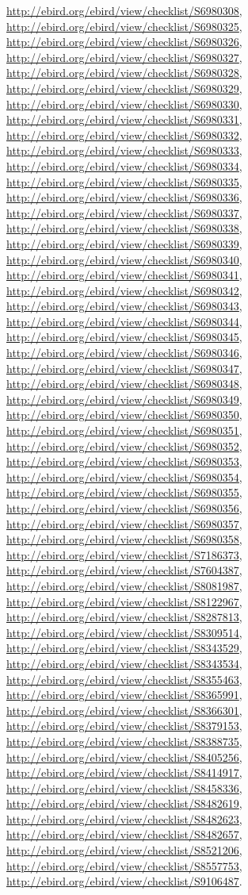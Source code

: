 \documentclass[9pt, article]{memoir}
\begin{document}
\begin{multicols}{2}
\url{http://ebird.org/ebird/view/checklist/S6980308}, 
\url{http://ebird.org/ebird/view/checklist/S6980325}, 
\url{http://ebird.org/ebird/view/checklist/S6980326}, 
\url{http://ebird.org/ebird/view/checklist/S6980327}, 
\url{http://ebird.org/ebird/view/checklist/S6980328}, 
\url{http://ebird.org/ebird/view/checklist/S6980329}, 
\url{http://ebird.org/ebird/view/checklist/S6980330}, 
\url{http://ebird.org/ebird/view/checklist/S6980331}, 
\url{http://ebird.org/ebird/view/checklist/S6980332}, 
\url{http://ebird.org/ebird/view/checklist/S6980333}, 
\url{http://ebird.org/ebird/view/checklist/S6980334}, 
\url{http://ebird.org/ebird/view/checklist/S6980335}, 
\url{http://ebird.org/ebird/view/checklist/S6980336}, 
\url{http://ebird.org/ebird/view/checklist/S6980337}, 
\url{http://ebird.org/ebird/view/checklist/S6980338}, 
\url{http://ebird.org/ebird/view/checklist/S6980339}, 
\url{http://ebird.org/ebird/view/checklist/S6980340}, 
\url{http://ebird.org/ebird/view/checklist/S6980341}, 
\url{http://ebird.org/ebird/view/checklist/S6980342}, 
\url{http://ebird.org/ebird/view/checklist/S6980343}, 
\url{http://ebird.org/ebird/view/checklist/S6980344}, 
\url{http://ebird.org/ebird/view/checklist/S6980345}, 
\url{http://ebird.org/ebird/view/checklist/S6980346}, 
\url{http://ebird.org/ebird/view/checklist/S6980347}, 
\url{http://ebird.org/ebird/view/checklist/S6980348}, 
\url{http://ebird.org/ebird/view/checklist/S6980349}, 
\url{http://ebird.org/ebird/view/checklist/S6980350}, 
\url{http://ebird.org/ebird/view/checklist/S6980351}, 
\url{http://ebird.org/ebird/view/checklist/S6980352}, 
\url{http://ebird.org/ebird/view/checklist/S6980353}, 
\url{http://ebird.org/ebird/view/checklist/S6980354}, 
\url{http://ebird.org/ebird/view/checklist/S6980355}, 
\url{http://ebird.org/ebird/view/checklist/S6980356}, 
\url{http://ebird.org/ebird/view/checklist/S6980357}, 
\url{http://ebird.org/ebird/view/checklist/S6980358}, 
\url{http://ebird.org/ebird/view/checklist/S7186373}, 
\url{http://ebird.org/ebird/view/checklist/S7604387}, 
\url{http://ebird.org/ebird/view/checklist/S8081987}, 
\url{http://ebird.org/ebird/view/checklist/S8122967}, 
\url{http://ebird.org/ebird/view/checklist/S8287813}, 
\url{http://ebird.org/ebird/view/checklist/S8309514}, 
\url{http://ebird.org/ebird/view/checklist/S8343529}, 
\url{http://ebird.org/ebird/view/checklist/S8343534}, 
\url{http://ebird.org/ebird/view/checklist/S8355463}, 
\url{http://ebird.org/ebird/view/checklist/S8365991}, 
\url{http://ebird.org/ebird/view/checklist/S8366301}, 
\url{http://ebird.org/ebird/view/checklist/S8379153}, 
\url{http://ebird.org/ebird/view/checklist/S8388735}, 
\url{http://ebird.org/ebird/view/checklist/S8405256}, 
\url{http://ebird.org/ebird/view/checklist/S8414917}, 
\url{http://ebird.org/ebird/view/checklist/S8458336}, 
\url{http://ebird.org/ebird/view/checklist/S8482619}, 
\url{http://ebird.org/ebird/view/checklist/S8482623}, 
\url{http://ebird.org/ebird/view/checklist/S8482657}, 
\url{http://ebird.org/ebird/view/checklist/S8521206}, 
\url{http://ebird.org/ebird/view/checklist/S8557753}, 
\url{http://ebird.org/ebird/view/checklist/S9106487}.


\end{multicols}
\end{document}
